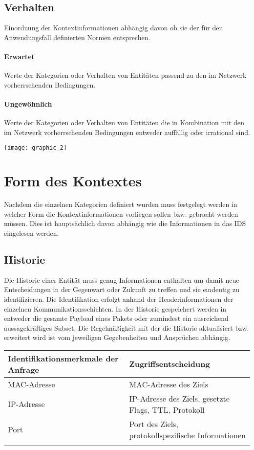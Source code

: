 \subsection{Verhalten}
Einordnung der Kontextinformationen abhängig davon ob sie der für den Anwendungsfall definierten Normen entsprechen.
\paragraph{Erwartet}
Werte der Kategorien oder Verhalten von Entitäten passend zu den im Netzwerk vorherrschenden Bedingungen.
\paragraph{Ungewöhnlich}
Werte der Kategorien oder Verhalten von Entitäten die in Kombination mit den im Netzwerk vorherrschenden Bedingungen entweder auffällig oder irrational sind.

\newpage
\texttt{[image: graphic\_2]}


\section{Form des Kontextes}
Nachdem die einzelnen Kategorien definiert wurden muss festgelegt werden in welcher Form die Kontextinformationen vorliegen sollen bzw. gebracht werden müssen. Dies ist hauptsächlich davon abhängig wie die Informationen in das IDS eingelesen werden.



\subsection{Historie}
Die Historie einer Entität muss genug Informationen enthalten um damit neue Entscheidungen in der Gegenwart oder Zukunft zu treffen und sie eindeutig zu identifizieren. Die Identifikation erfolgt anhand der Headerinformationen der einzelnen  Kommunikationsschichten. In der Historie gespeichert werden in entweder die gesamte Payload eines Pakets oder zumindest ein ausreichend aussagekräftiges Subset. Die Regelmäßigkeit mit der die Historie aktualisiert bzw. erweitert wird ist vom jeweiligen Gegebenheiten und Ansprüchen abhängig.\\
\begin{tabularx}{1\textwidth} { 
  | >{\raggedright\arraybackslash}X 
  | >{\raggedright\arraybackslash}X 
  | }
 \hline
 Identifikationsmerkmale der Anfrage & Zugriffsentscheidung \\
 \hline
 MAC-Adresse & MAC-Adresse des Ziels  \\\hline
 IP-Adresse &  IP-Adresse des Ziels, gesetzte Flags, TTL, Protokoll \\\hline
 Port & Port des Ziels, protokollspezifische Informationen\\
 		& 			\\
\hline
\end{tabularx}



